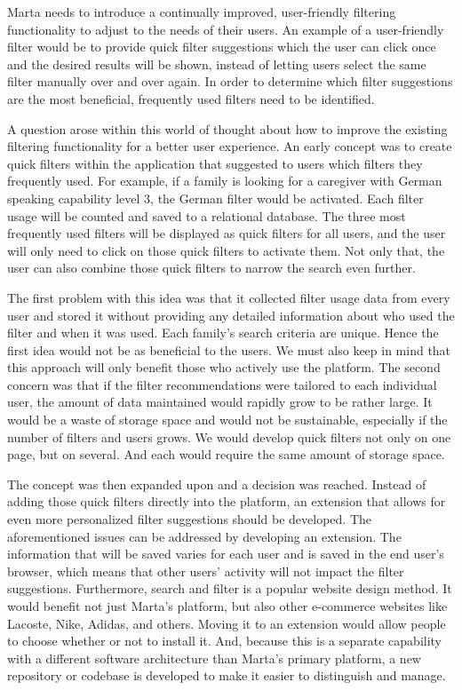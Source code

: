 Marta needs to introduce a continually improved, user-friendly filtering functionality to adjust to the needs of their users. An example of a user-friendly filter would be to provide quick filter suggestions which the user can click once and the desired results will be shown, instead of letting users select the same filter manually over and over again. In order to determine which filter suggestions are the most beneficial, frequently used filters need to be identified.

A question arose within this world of thought about how to improve the existing filtering functionality for a better user experience. An early concept was to create quick filters within the application that suggested to users which filters they frequently used. For example, if a family is looking for a caregiver with German speaking capability level 3, the German filter would be activated. Each filter usage will be counted and saved to a relational database. The three most frequently used filters will be displayed as quick filters for all users, and the user will only need to click on those quick filters to activate them. Not only that, the user can also combine those quick filters to narrow the search even further.

The first problem with this idea was that it collected filter usage data from every user and stored it without providing any detailed information about who used the filter and when it was used. Each family's search criteria are unique. Hence the first idea would not be as beneficial to the users. We must also keep in mind that this approach will only benefit those who actively use the platform. The second concern was that if the filter recommendations were tailored to each individual user, the amount of data maintained would rapidly grow to be rather large. It would be a waste of storage space and would not be sustainable, especially if the number of filters and users grows. We would develop quick filters not only on one page, but on several. And each would require the same amount of storage space.

The concept was then expanded upon and a decision was reached. Instead of adding those quick filters directly into the platform, an extension that allows for even more personalized filter suggestions should be developed. The aforementioned issues can be addressed by developing an extension. The information that will be saved varies for each user and is saved in the end user's browser, which means that other users' activity will not impact the filter suggestions. Furthermore, search and filter is a popular website design method. It would benefit not just Marta's platform, but also other e-commerce websites like Lacoste, Nike, Adidas, and others. Moving it to an extension would allow people to choose whether or not to install it. And, because this is a separate capability with a different software architecture than Marta's primary platform, a new repository or codebase is developed to make it easier to distinguish and manage.

